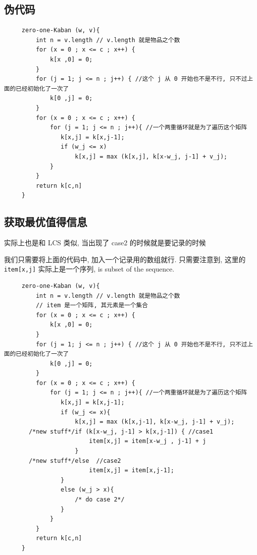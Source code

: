 \documentclass[a4paper, 10pt]{ctexart} %
\begin{document}
\subsection{伪代码}
\begin{verbatim}
     zero-one-Kaban (w, v){
         int n = v.length // v.length 就是物品之个数
         for (x = 0 ; x <= c ; x++) {
             k[x ,0] = 0;
         }
         for (j = 1; j <= n ; j++) { //这个 j 从 0 开始也不是不行, 只不过上面的已经初始化了一次了
             k[0 ,j] = 0;
         }
         for (x = 0 ; x <= c ; x++) {
             for (j = 1; j <= n ; j++){ //一个两重循环就是为了遍历这个矩阵
                k[x,j] = k[x,j-1];
                if (w_j <= x)
                    k[x,j] = max (k[x,j], k[x-w_j, j-1] + v_j);
             }
         }
         return k[c,n]
     }
\end{verbatim}
\subsection{获取最优值得信息}
实际上也是和 LCS 类似, 当出现了 case2 的时候就是要记录的时候

我们只需要将上面的代码中, 加入一个记录用的数组就行. 只需要注意到, 这里的 \verb|item[x,j]| 实际上是一个序列, is subset of the
sequence.
\begin{verbatim}
     zero-one-Kaban (w, v){
         int n = v.length // v.length 就是物品之个数
         // item 是一个矩阵, 其元素是一个集合
         for (x = 0 ; x <= c ; x++) {
             k[x ,0] = 0;
         }
         for (j = 1; j <= n ; j++) { //这个 j 从 0 开始也不是不行, 只不过上面的已经初始化了一次了
             k[0 ,j] = 0;
         }
         for (x = 0 ; x <= c ; x++) {
             for (j = 1; j <= n ; j++){ //一个两重循环就是为了遍历这个矩阵
                k[x,j] = k[x,j-1];
                if (w_j <= x){
                    k[x,j] = max (k[x,j-1], k[x-w_j, j-1] + v_j);
       /*new stuff*/if (k[x-w_j, j-1] > k[x,j-1]) { //case1
                        item[x,j] = item[x-w_j , j-1] + j 
                    }
       /*new stuff*/else  //case2
                        item[x,j] = item[x,j-1];
                }
                else (w_j > x){
                    /* do case 2*/
                }
             }
         }
         return k[c,n]
     }
\end{verbatim}
\end{document}
